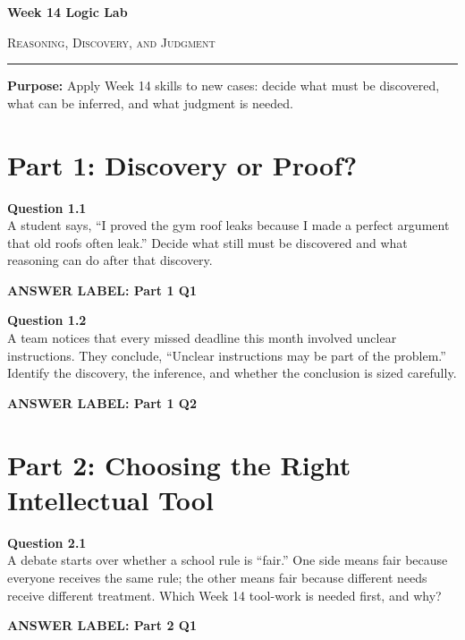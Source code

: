 \documentclass[12pt]{article}
\newcommand{\answerbox}[2]{%
\vspace{0.15em}
\noindent\textbf{#1}\par
\vspace{0.05em}
\noindent\fbox{%
\begin{minipage}[t][#2]{\dimexpr\textwidth-2\fboxsep-2\fboxrule}
\rule{\textwidth}{0pt}
\vspace{#2}
\end{minipage}
}\par
\vspace{0.25em}
}
\begin{document}
\begin{center}
{\LARGE\bfseries Week 14 Logic Lab}\par\vspace{0.05em}
{\large\scshape Reasoning, Discovery, and Judgment}\par\vspace{0.1em}
\rule{0.78\textwidth}{0.5pt}\par\vspace{0.15em}
\end{center}

\noindent\textbf{Purpose:} Apply Week 14 skills to new cases: decide what must be discovered, what can be inferred, and what judgment is needed.

\vspace{0.3em}

\section*{Part 1: Discovery or Proof?}

\textbf{Question 1.1}\\[-0.15em]
A student says, ``I proved the gym roof leaks because I made a perfect argument that old roofs often leak.'' Decide what still must be discovered and what reasoning can do after that discovery.

\answerbox{ANSWER LABEL: Part 1 Q1}{2.35in}

\textbf{Question 1.2}\\[-0.15em]
A team notices that every missed deadline this month involved unclear instructions. They conclude, ``Unclear instructions may be part of the problem.'' Identify the discovery, the inference, and whether the conclusion is sized carefully.

\answerbox{ANSWER LABEL: Part 1 Q2}{2.35in}

\newpage

\section*{Part 2: Choosing the Right Intellectual Tool}

\textbf{Question 2.1}\\[-0.15em]
A debate starts over whether a school rule is ``fair.'' One side means fair because everyone receives the same rule; the other means fair because different needs receive different treatment. Which Week 14 tool-work is needed first, and why?

\answerbox{ANSWER LABEL: Part 2 Q1}{2.45in}
\end{document}
